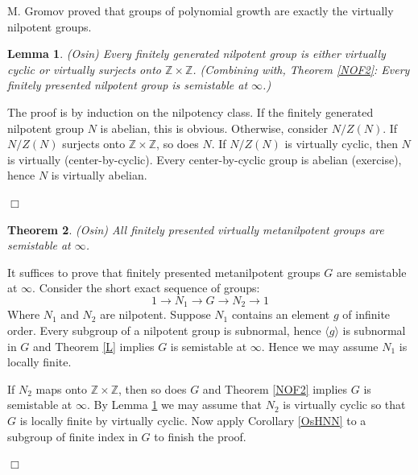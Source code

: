 \documentclass[12pt]{article}
\newtheorem{theorem}{Theorem}[subsection]
\newtheorem{lemma}[theorem]{Lemma}
\newenvironment{proof}{\addvspace{12pt}\noindent{\bf Proof:}}{
$\Box$\par\addvspace{12pt}}
\begin{document}
M. Gromov \cite{Gro81} proved that groups of polynomial growth are exactly the virtually nilpotent groups. 
\begin{lemma} (Osin) \label{nil1} 
Every finitely generated nilpotent group is either virtually cyclic or virtually surjects onto $\mathbb Z \times \mathbb Z$. (Combining with, Theorem \ref{NOF2}: Every finitely presented nilpotent group is semistable at $\infty$.)
\end{lemma}  
\begin{proof}
The proof is by induction on the nilpotency class. If the finitely generated nilpotent group $N$ is abelian, this is obvious. Otherwise, consider $N/Z(N)$. If $N/Z(N)$ surjects onto $\mathbb Z \times \mathbb Z$, so does $N$. If $N/Z(N)$ is virtually cyclic, then $N$ is virtually (center-by-cyclic). Every center-by-cyclic group is abelian (exercise), hence $N$ is virtually abelian.
\end{proof}
\begin{theorem} (Osin) \label{metanil} 
All finitely presented virtually metanilpotent groups are semistable at $\infty$. 
\end{theorem}
\begin{proof} 
It suffices to prove that finitely presented metanilpotent groups $G$ are semistable at $\infty$. 
Consider the short exact sequence of groups:
$$1\to N_1\to G\to N_2\to 1$$
Where $N_1$ and $N_2$ are nilpotent. Suppose $N_1$ contains an element $g$ of infinite order. Every subgroup of a nilpotent group is subnormal, hence $\langle g\rangle$ is subnormal in $G$ and Theorem \ref{L} implies $G$ is semistable at $\infty$. Hence we may assume $N_1$ is locally finite. 

If $N_2$ maps onto $\mathbb Z\times \mathbb Z$, then so does $G$ and Theorem \ref{NOF2} implies $G$ is semistable at $\infty$. By Lemma \ref{nil1} we may assume that $N_2$ is virtually cyclic so that  $G$ is locally finite by virtually cyclic. Now apply Corollary \ref{OsHNN} to a subgroup of finite index in $G$ to finish the proof. 
\end{proof}
\end{document}
